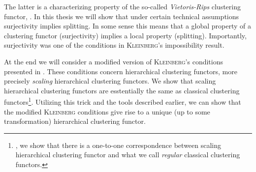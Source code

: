 The latter is a characterizing property of the so-called \emph{Vietoris-Rips} clustering functor, \cite[Thm.~6.4]{Carlsson2010}.
In this thesis we will show that under certain technical assumptions surjectivity implies splitting. In some sense this means that a global property of a clustering functor (surjectivity) implies a local property (splitting). Importantly, surjectivity was one of the conditions in \textsc{Kleinberg}'s impossibility result.

At the end we will consider a modified version of \textsc{Kleinberg}'s conditions presented in \cite[Sec.~7.3.1]{Carlsson2010}. These conditions concern hierarchical clustering functors, more precisely \emph{scaling} hierarchical clustering functors. We show that scaling hierarchical clustering functors are esstentially the same as classical clustering functors\footnote{\Ie, we show that there is a one-to-one correspondence between scaling hierarchical clustering functor and what we call \emph{regular} classical clustering functors.}. Utilizing this trick and the tools described earlier, we can show that the modified \textsc{Kleinberg} conditions give rise to a unique (up to some transformation) hierarchical clustering functor.






